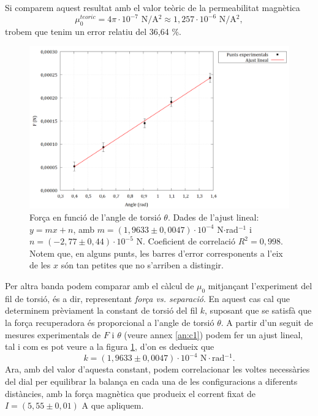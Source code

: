 \documentclass[a4paper,10.5pt]{report}
\begin{document}
Si comparem aquest resultat amb el valor teòric de la permeabilitat magnètica
\begin{equation*}
	\mu_0^{teoric} = 4\pi\cdot 10^{-7} \text{ N/A$^2$} \approx 1,257\cdot10^{-6} \text{ N/A$^2$},
\end{equation*}
trobem que tenim un error relatiu del 36,64 \%.

\begin{figure}[H]
	\centering
	\includegraphics[width=0.8\linewidth]{screenshot017}
	\caption{Força en funció de l'angle de torsió $\theta$. Dades de l'ajust lineal: $y=mx+n$, amb $m=(1,9633\pm0,0047)\cdot10^{-4}$ N$\cdot$rad$^{-1}$ i $n=(-2,77\pm0,44)\cdot10^{-5}$ N. Coeficient de correlació $R^2=0,998$. Notem que, en alguns punts, les barres d'error corresponents a l'eix de les $x$ són tan petites que no s'arriben a distingir.}
	\label{fig:2.4}
\end{figure}

Per altra banda podem comparar amb el càlcul de $\mu_0$ mitjançant l'experiment del fil de torsió, és a dir, representant \textit{força vs. separació}. En aquest cas cal que determinem prèviament la constant de torsió del fil $k$, suposant que se satisfà que la força recuperadora és proporcional a l'angle de torsió $\theta$. A partir d'un seguit de mesures experimentals de $F$ i $\theta$ (veure annex \ref{an:c1}) podem fer un ajust lineal, tal i com es pot veure a la figura \ref{fig:2.4}, d'on es dedueix que
\begin{equation}
	k = (1,9633\pm 0,0047)\cdot 10^{-4} \text{ N$\cdot$rad$^{-1}$}.
\end{equation}
Ara, amb del valor d'aquesta constant, podem correlacionar les voltes necessàries del dial per equilibrar la balança en cada una de les configuracions a diferents distàncies, amb la força magnètica que produeix el corrent fixat de $I = (5,55 \pm 0,01)$ A que apliquem. 
\end{document}
